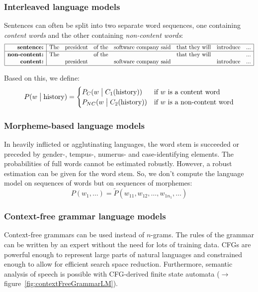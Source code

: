 \subsubsection{Interleaved language models}
Sentences can often be split into two separate word sequences, one containing \textit{content words} and the other containing \textit{non-content words}:
\[
\begin{array}{|r|ccccccc|}
    \hline
    \mbox{\textbf{sentence:}} & \mbox{The} & \mbox{president} & \mbox{of the} & \mbox{software company said} & \mbox{that they will} & \mbox{introduce} & \mbox{...} \\
    \hline
    \mbox{\textbf{non-content:}} & \mbox{The} & & \mbox{of the} & & \mbox{that they will} & & \mbox{...} \\
    \mbox{\textbf{content:}} & & \mbox{president} & & \mbox{software company said} & & \mbox{introduce} & \mbox{...} \\
    \hline
\end{array}
\]

Based on this, we define:
\[
    P(w \bigm| \mbox{history}) = \begin{cases}
        P_C(w \bigm| C_1(\mbox{history})) & \mbox{if $w$ is a content word} \\
        P_{NC}(w \bigm| C_2(\mbox{history})) & \mbox{if $w$ is a non-content word}
    \end{cases}
\]

\subsubsection{Morpheme-based language models}
In heavily inflicted or agglutinating languages, the word stem is succeeded or preceded by gender-, tempus-, numerus- and case-identifying elements. The probabilities of full words cannot be estimated robustly. However, a robust estimation can be given for the word stem. So, we don't compute the language model on sequences of words but on sequences of morphemes:
\[
    P(w_1, \ldots) = \tilde{P}(w_{11}, w_{12}, \ldots, w_{1n_1}, \ldots)
\]

\subsubsection{Context-free grammar language models}
Context-free grammars can be used instead of $n$-grams. The rules of the grammar can be written by an expert without the need for lots of training data. CFGs are powerful enough to represent large parts of natural languages and constrained enough to allow for efficient search space reduction. Furthermore, semantic analysis of speech is possible with CFG-derived finite state automata ($\to$ figure~\ref{fig:contextFreeGrammarLM}).

